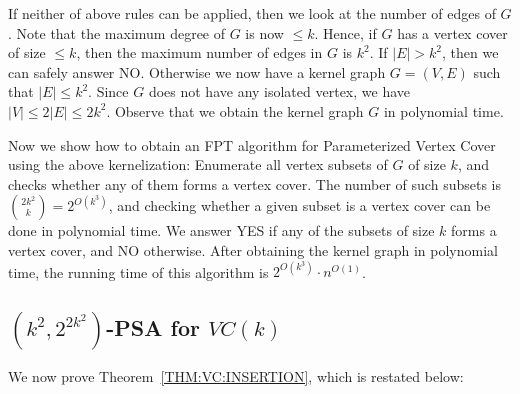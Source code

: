 \documentclass[11pt,letter]{article}
\begin{document}
If neither of above rules can be applied, then we look at the number of edges of $G$. Note that the maximum degree of $G$ is now $\leq k$. Hence, if $G$ has a vertex cover of size $\leq k$, then the maximum number of edges in $G$ is $k^2$. If $|E|> k^2$, then we can safely answer NO. Otherwise we now have a kernel graph $G=(V, E)$ such that $|E|\leq k^2$. Since $G$ does not have any isolated vertex, we have $|V|\leq 2|E|\leq 2k^2$. Observe that we obtain the kernel graph $G$ in polynomial time.


Now we show how to obtain an FPT algorithm for Parameterized Vertex Cover using the above kernelization: Enumerate all vertex subsets of
$G$ of size $k$, and checks whether any of them forms a vertex cover. The number of such subsets is $\binom{2k^2}{k}=2^{O(k^3)}$,
and checking whether a given subset is a vertex cover can be done in polynomial time.
We answer YES if any of the subsets of size $k$ forms a vertex cover, and NO otherwise. After obtaining the kernel graph in polynomial time, the running time of this algorithm is $2^{O(k^3)}\cdot n^{O(1)}$.

\subsection{$(k^2, 2^{2k^2})$-PSA for $VC(k)$}
\label{subsec:psa-vc}

We now prove Theorem~\ref{THM:VC:INSERTION}, which is restated below:
\end{document}
